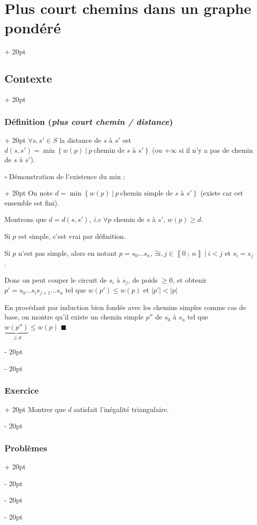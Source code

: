 \documentclass[a4paper, 12pt, twoside]{article}
\newcommand{\nset}[2]{\left\llbracket #1\ ;\ #2 \right\rrbracket}
\newcommand{\set}[1]{\left\{ #1 \right\}}
\newcommand{\abs}[1]{\left\lvert #1 \right\rvert}
\renewcommand{\le}{\leqslant}
\renewcommand{\ge}{\geqslant}
\newcommand{\ind}[1][20pt]{\advance\leftskip + #1}
\newcommand{\deind}[1][20pt]{\advance\leftskip - #1}
\newenvironment{indt}[2][20pt]{#2 \par \ind[#1]}{\par \deind} %
\begin{document}
\begin{indt}{\section{Plus court chemins dans un graphe pondéré}}
\begin{indt}{\subsection{Contexte}}
\begin{indt}{\subsubsection{Définition (\textit{plus court chemin / distance})}}
                $\forall s, s' \in S$ la distance de $s$ à $s'$ est $d(s, s') = \min\set{w(p)\ |\ p\ \text{chemin de $s$ à $s'$}}$ (ou $+\infty$ si il n'y a pas de chemin de $s$ à $s'$).

                \vspace{12pt}
                
                \begin{indt}{$\square$ Démonstration de l'existence du min :}
                    On note $d = \min\set{w(p)\ |\ p\ \text{chemin simple de $s$ à $s'$}}$ (existe car cet ensemble est fini).

                    Montrons que $d = d(s, s')$, \textit{i.e} $\forall p$ chemin de $s$ à $s'$, $w(p) \ge d$.

                    Si $p$ est simple, c'est vrai par définition.

                    Si $p$ n'est pas simple, alors en notant $p = s_0 \ldots s_n$, $\exists i, j \in \nset 0 n\ |\ i < j$ et $s_i = s_j$.

                    Donc on peut couper le circuit de $s_i$ à $s_j$, de poids $\ge 0$, et obtenir $p' = s_0 \ldots s_i s_{j + 1} \ldots s_n$ tel que
                    $w(p') \le w(p)$ et $\abs{p'} < \abs p$

                    En procédant par induction bien fondée avec les chemins simples comme cas de base, on montre qu'il existe un chemin simple $p''$ de $s_0$ à $s_n$ tel que
                    $\underbrace{w(p'')}_{\ge d} \le w(p)$ $\blacksquare$
                \end{indt}
            \end{indt}

            \vspace{12pt}
            
            \begin{indt}{\subsubsection{Exercice}}
                Montrer que $d$ satisfait l'inégalité triangulaire.
            \end{indt}

            \vspace{12pt}
            
            \begin{indt}{\subsubsection{Problèmes}}
                \label{5.1.6}


\end{indt}
\end{indt}
\end{indt}
\end{document}

